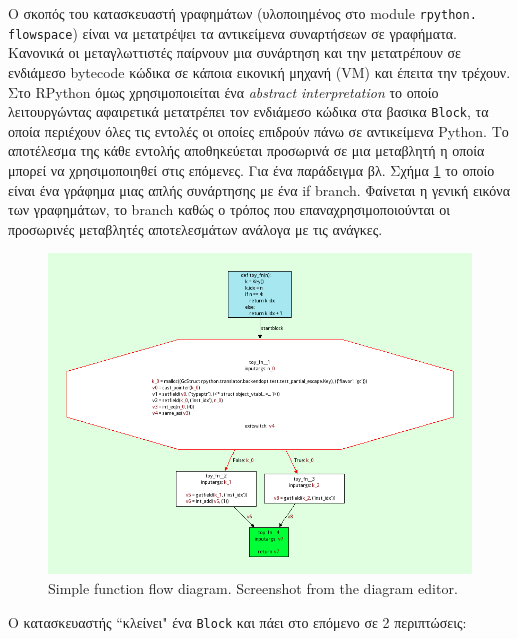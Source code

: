 Ο σκοπός του κατασκευαστή γραφημάτων (υλοποιημένος στο module
\texttt{rpython. \\ flowspace}) είναι να μετατρέψει τα αντικείμενα συναρτήσεων σε
γραφήματα. Κανονικά οι μεταγλωττιστές παίρνουν μια συνάρτηση και την
μετατρέπουν σε ενδιάμεσο bytecode κώδικα σε κάποια εικονική μηχανή (VM) και
έπειτα την τρέχουν. Στο RPython όμως χρησιμοποιείται ένα \textit{abstract
interpretation} το οποίο λειτουργώντας αφαιρετικά μετατρέπει τον ενδιάμεσο
κώδικα στα βασικα \texttt{Block}, τα οποία περιέχουν όλες τις εντολές οι
οποίες επιδρούν πάνω σε αντικείμενα Python. Το αποτέλεσμα της κάθε εντολής
αποθηκεύεται προσωρινά σε μια μεταβλητή η οποία μπορεί να χρησιμοποιηθεί στις
επόμενες. Για ένα παράδειγμα βλ. Σχήμα \ref{figure-2} το οποίο είναι ένα
γράφημα μιας απλής συνάρτησης με ένα if branch. Φαίνεται η γενική εικόνα των
γραφημάτων, το branch καθώς ο τρόπος που επαναχρησιμοποιούνται οι προσωρινές
μεταβλητές αποτελεσμάτων ανάλογα με τις ανάγκες.

\begin{figure}[h]
\centering
\includegraphics[width=\textwidth]{simple-func-bef.png}
\caption{Simple function flow diagram. Screenshot from the diagram editor.}
\label{figure-2}
\end{figure}

Ο κατασκευαστής ``κλείνει" ένα \texttt{Block} και πάει στο επόμενο σε 2 
περιπτώσεις:


